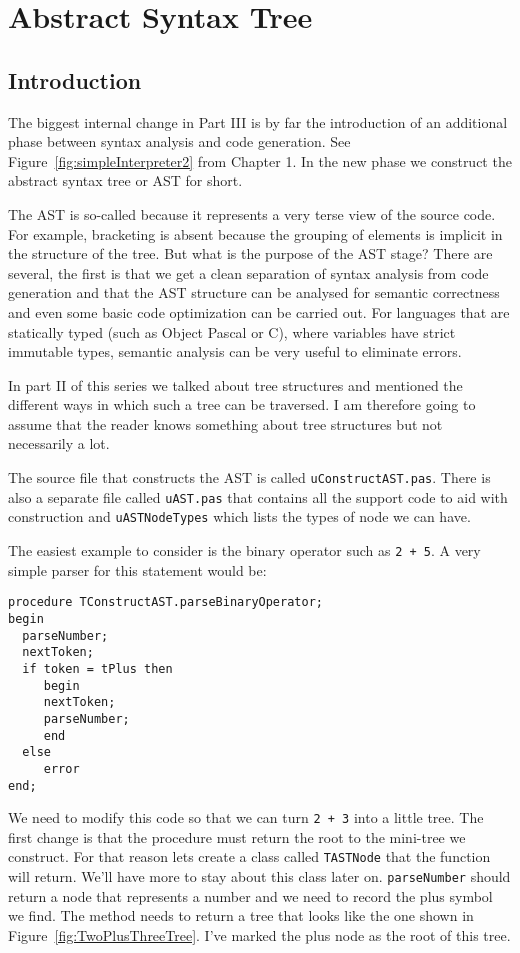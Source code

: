 {\bfseries\slshape\sffamily\color{ChapterTitleColor} \chapter{Abstract Syntax Tree}} \label{chap:AST}

\section{Introduction}

The biggest internal change in Part III is by far the introduction of an additional phase between syntax analysis and code generation. See Figure~\ref{fig:simpleInterpreter2} from Chapter 1. In the new phase we construct the abstract syntax tree or AST for short.

The AST is so-called because it represents a very terse view of the source code. For example, bracketing is absent because the grouping of elements is implicit in the structure of the tree. But what is the purpose of the AST stage? There are several, the first is that we get a clean separation of syntax analysis from code generation and that the AST structure can be analysed for semantic correctness and even some basic code optimization can be carried out. For languages that are statically typed (such as Object Pascal or C), where variables have strict immutable types, semantic analysis can be very useful to eliminate errors.

In part II of this series we talked about tree structures and mentioned the different ways in which such a tree can be traversed. I am therefore going to assume that the reader knows something about tree structures but not necessarily a lot.

The source file that constructs the AST is called {\tt uConstructAST.pas}. There is also a separate file called {\tt uAST.pas} that contains all the support code to aid with construction and {\tt uASTNodeTypes} which lists the types of node we can have. 

The easiest example to consider is the binary operator such as {\tt 2 + 5}. A very simple parser for this statement would be:

\begin{lstlisting}
procedure TConstructAST.parseBinaryOperator;
begin
  parseNumber;
  nextToken;
  if token = tPlus then
     begin
     nextToken;
     parseNumber;
     end
  else
     error
end;
\end{lstlisting}

We need to modify this code so that we can turn {\tt 2 + 3} into a little tree. The first change is that the procedure must return the root to the mini-tree we construct. For that reason lets create a class called {\tt TASTNode} that the function will return. We'll have more to stay about this class later on. {\tt parseNumber} should return a node that represents a number and we need to record the plus symbol we find. The method needs to return a tree that looks like the one shown in Figure~\ref{fig:TwoPlusThreeTree}. I've marked the plus node as the root of this tree.


